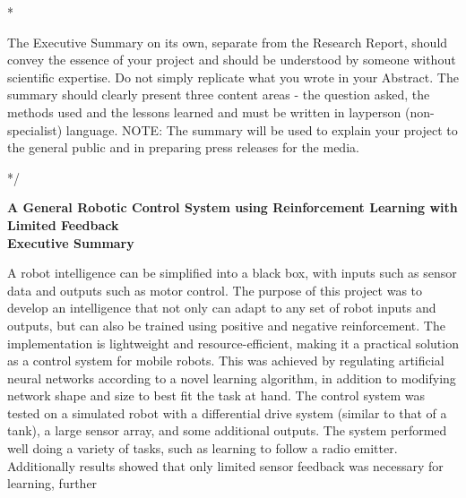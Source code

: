 \documentclass[letterpaper,12pt]{article}
\begin{document}
\/*

The Executive Summary on its own, separate from the Research Report, should convey the essence of your project and should be understood by someone without scientific expertise. Do not simply replicate what you wrote in your Abstract. The summary should clearly present three content areas - the question asked, the methods used and the lessons learned and must be written in layperson (non-specialist) language. NOTE: The summary will be used to explain your project to the general public and in preparing press releases for the media.

*/

\begin{center}
	{\Large
	\textbf{A General Robotic Control System using Reinforcement Learning with Limited Feedback}}\\
	\vspace{1cm}
	{\large \textbf{Executive Summary}}
\end{center}

\noindent

A robot intelligence can be simplified into a black box, with inputs such as sensor data and outputs such as motor control.  The purpose of this project was to develop an intelligence that not only can adapt to any set of robot inputs and outputs, but can also be trained using positive and negative reinforcement.  The implementation is lightweight and resource-efficient, making it a practical solution as a control system for mobile robots.  This was achieved by regulating artificial neural networks according to a novel learning algorithm, in addition to modifying network shape and size to best fit the task at hand.  The control system was tested on a simulated robot with a differential drive system (similar to that of a tank), a large sensor array, and some additional outputs.  The system performed well doing a variety of tasks, such as learning to follow a radio emitter.  Additionally results showed that only limited sensor feedback was necessary for learning, further 
\end{document}
